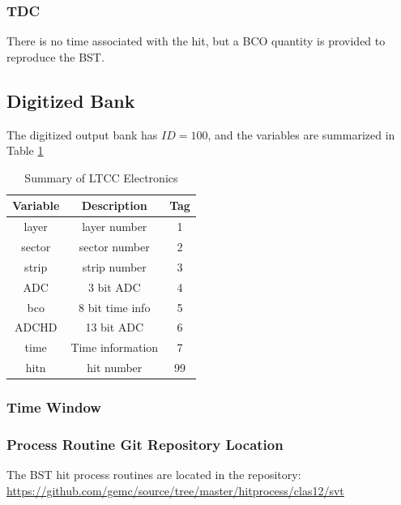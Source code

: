 \subsubsection{TDC}
There is no time associated with the hit, but a BCO quantity is provided to reproduce the BST.

\subsection{Digitized Bank}
The digitized output bank has $ID=100$, and the variables are summarized in Table \ref{tab:bstBank}

\begin{table}[h]
	\begin{center}
		\begin{tabular}{| c | c | c |}
			\hline \hline
			Variable         & Description  & Tag  \\
			\hline
               layer  &                                      layer number  &    1   \\
              sector  &                                     sector number  &    2   \\
               strip  &                                      strip number  &    3   \\
                 ADC  &                                         3 bit ADC  &    4   \\
                 bco  &                                   8 bit time info  &    5   \\
               ADCHD  &                                        13 bit ADC  &    6   \\
                time  &                                  Time information  &    7   \\
                hitn  &                                        hit number  &   99   \\
			\hline \hline
		\end{tabular}
	\end{center}
	\caption{Summary of LTCC Electronics}\label{tab:bstBank}
\end{table}


\subsubsection{Time Window}

\subsubsection{Process Routine Git Repository Location}


The BST hit process routines are located in the repository: \url{https://github.com/gemc/source/tree/master/hitprocess/clas12/svt}
